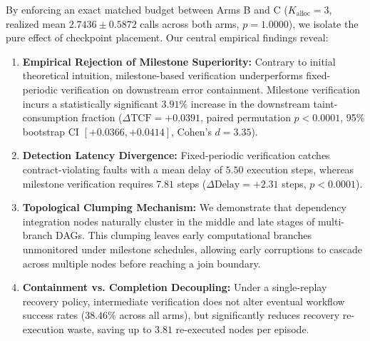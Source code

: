 By enforcing an exact matched budget between Arms B and C ($K_{\text{alloc}} = 3$, realized mean $2.7436 \pm 0.5872$ calls across both arms, $p = 1.0000$), we isolate the pure effect of checkpoint placement. Our central empirical findings reveal:
\begin{enumerate}
    \item \textbf{Empirical Rejection of Milestone Superiority:} Contrary to initial theoretical intuition, milestone-based verification underperforms fixed-periodic verification on downstream error containment. Milestone verification incurs a statistically significant $3.91\%$ increase in the downstream taint-consumption fraction ($\Delta \text{TCF} = +0.0391$, paired permutation $p < 0.0001$, 95\% bootstrap CI $[+0.0366, +0.0414]$, Cohen's $d = 3.35$).
    \item \textbf{Detection Latency Divergence:} Fixed-periodic verification catches contract-violating faults with a mean delay of $5.50$ execution steps, whereas milestone verification requires $7.81$ steps ($\Delta \text{Delay} = +2.31$ steps, $p < 0.0001$).
    \item \textbf{Topological Clumping Mechanism:} We demonstrate that dependency integration nodes naturally cluster in the middle and late stages of multi-branch DAGs. This clumping leaves early computational branches unmonitored under milestone schedules, allowing early corruptions to cascade across multiple nodes before reaching a join boundary.
    \item \textbf{Containment vs. Completion Decoupling:} Under a single-replay recovery policy, intermediate verification does not alter eventual workflow success rates ($38.46\%$ across all arms), but significantly reduces recovery re-execution waste, saving up to $3.81$ re-executed nodes per episode.
\end{enumerate}
